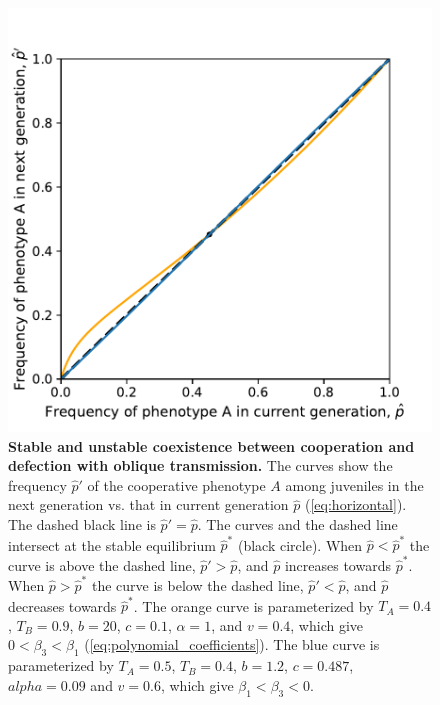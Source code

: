\documentclass[12pt]{extarticle}
\begin{document}
{%
\begin{figure}[htb]
  \centering
  \includegraphics{coexistence_with_oblique.pdf}
  \caption{\textbf{Stable and unstable coexistence between cooperation and defection with oblique transmission.}
  The curves show the frequency $\hat{p}'$ of the cooperative phenotype $A$ among juveniles in the next generation vs. that in current generation $\hat{p}$ (\autoref{eq:horizontal}).
  The dashed black line is $\hat{p}'=\hat{p}$.
  The curves and the dashed line intersect at the stable equilibrium $\hat{p}^*$ (black circle).
  When $\hat{p} < \hat{p}^*$ the curve is above the dashed line, $\hat{p}' > \hat{p}$, and $\hat{p}$ increases towards $\hat{p}^*$.
  When $\hat{p} > \hat{p}^*$ the curve is below the dashed line, $\hat{p}' < \hat{p}$, and $\hat{p}$ decreases towards $\hat{p}^*$.
  The orange curve is parameterized by $T_A = 0.4$, $T_B = 0.9$, $b = 20$, $c=0.1$, $\alpha = 1$, and $v=0.4$, which give $0<\beta_3<\beta_1$ (\autoref{eq:polynomial_coefficients}).
  The blue curve is parameterized by $T_A = 0.5$, $T_B = 0.4$, $b=1.2$, $c=0.487$, $alpha = 0.09$ and $v=0.6$, which give $\beta_1<\beta_3<0$.
  }
  \label{fig:coexistence_with_oblique}
  \end{figure}
\pagebreak

}
\end{document}

